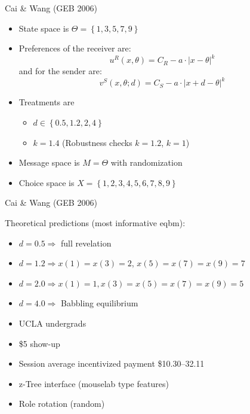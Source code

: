 \documentclass{beamer}
\begin{document}
\begin{frame}{Cai \& Wang (GEB 2006)}
\begin{card}
	\begin{itemize}
		\item State space is $\Theta=\left\{1,3,5,7,9 \right\}$
		\item Preferences of the receiver are:
				$$u^R(x,\theta)=C_R-a\cdot \left|x-\theta\right|^{k}$$
				and for the sender are:
				$$v^S(x,\theta;d)=C_S-a\cdot \left|x+d-\theta\right|^{k}$$
		\item Treatments are 
		\begin{itemize}
			\item $d\in\left\{0.5,1.2,2,4 \right\}$
			\item $k=1.4$ (Robustness checks $k=1.2$, $k=1$)
		\end{itemize}
		\item Message space is $M=\Theta$ with randomization
		\item Choice space is $X=\left\{1,2,3,4,5,6,7,8,9 \right\}$
	\end{itemize}
	\end{card}
\end{frame}
\begin{frame}{Cai \& Wang (GEB 2006)}
	\begin{card}
    Theoretical predictions (most informative eqbm):
		\begin{itemize}
			\item $d=0.5\Longrightarrow$ full revelation
			\item $d=1.2\Longrightarrow x(1)=x(3)=2$, $x(5)=x(7)=x(9)=7$
			\item $d=2.0 \Longrightarrow x(1)=1, x(3)=x(5)=x(7)=x(9)=5$
			\item $d=4.0 \Longrightarrow$ Babbling equilibrium
		\end{itemize}
	\end{card}
\end{frame}
\begin{frame}
\begin{card}
	\begin{itemize}
		\item UCLA undergrads
		\item \$5 show-up
		\item Session average incentivized payment \$10.30--32.11
		\item z-Tree interface (mouselab type features)
		\item Role rotation (random)
	\end{itemize}
\end{card}
\end{frame}
\end{document}
